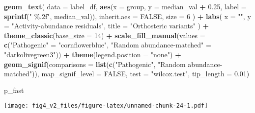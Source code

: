 \documentclass[
]{article}
\newenvironment{Shaded}{\begin{snugshade}}{\end{snugshade}}
\newcommand{\AttributeTok}[1]{\textcolor[rgb]{0.13,0.29,0.53}{#1}}
\newcommand{\ConstantTok}[1]{\textcolor[rgb]{0.56,0.35,0.01}{#1}}
\newcommand{\DecValTok}[1]{\textcolor[rgb]{0.00,0.00,0.81}{#1}}
\newcommand{\FloatTok}[1]{\textcolor[rgb]{0.00,0.00,0.81}{#1}}
\newcommand{\FunctionTok}[1]{\textcolor[rgb]{0.13,0.29,0.53}{\textbf{#1}}}
\newcommand{\NormalTok}[1]{#1}
\newcommand{\OtherTok}[1]{\textcolor[rgb]{0.56,0.35,0.01}{#1}}
\newcommand{\SpecialCharTok}[1]{\textcolor[rgb]{0.81,0.36,0.00}{\textbf{#1}}}
\newcommand{\StringTok}[1]{\textcolor[rgb]{0.31,0.60,0.02}{#1}}
\begin{document}
\begin{Shaded}
\begin{Highlighting}[]
  \FunctionTok{geom\_text}\NormalTok{(}
    \AttributeTok{data =}\NormalTok{ label\_df,}
    \FunctionTok{aes}\NormalTok{(}\AttributeTok{x =}\NormalTok{ group, }\AttributeTok{y =}\NormalTok{ median\_val }\SpecialCharTok{+} \FloatTok{0.25}\NormalTok{, }\AttributeTok{label =} \FunctionTok{sprintf}\NormalTok{(}\StringTok{" \%.2f"}\NormalTok{, median\_val)),}
    \AttributeTok{inherit.aes =} \ConstantTok{FALSE}\NormalTok{,}
    \AttributeTok{size =} \DecValTok{6}
\NormalTok{  ) }\SpecialCharTok{+}
  \FunctionTok{labs}\NormalTok{(}
    \AttributeTok{x =} \StringTok{""}\NormalTok{,}
    \AttributeTok{y =} \StringTok{"Activity{-}abundance residuals"}\NormalTok{,}
    \AttributeTok{title =} \StringTok{"Orthosteric variants"}
\NormalTok{  ) }\SpecialCharTok{+}
  \FunctionTok{theme\_classic}\NormalTok{(}\AttributeTok{base\_size =} \DecValTok{14}\NormalTok{) }\SpecialCharTok{+}
  \FunctionTok{scale\_fill\_manual}\NormalTok{(}\AttributeTok{values =} \FunctionTok{c}\NormalTok{(}\StringTok{"Pathogenic"} \OtherTok{=} \StringTok{"cornflowerblue"}\NormalTok{, }\StringTok{"Random abundance{-}matched"} \OtherTok{=} \StringTok{"darkolivegreen3"}\NormalTok{)) }\SpecialCharTok{+}
  \FunctionTok{theme}\NormalTok{(}\AttributeTok{legend.position =} \StringTok{"none"}\NormalTok{) }\SpecialCharTok{+}
  \FunctionTok{geom\_signif}\NormalTok{(}\AttributeTok{comparisons =} \FunctionTok{list}\NormalTok{(}\FunctionTok{c}\NormalTok{(}\StringTok{"Pathogenic"}\NormalTok{, }\StringTok{"Random abundance{-}matched"}\NormalTok{)),}
              \AttributeTok{map\_signif\_level =} \ConstantTok{FALSE}\NormalTok{,}
              \AttributeTok{test =} \StringTok{"wilcox.test"}\NormalTok{,}
              \AttributeTok{tip\_length =} \FloatTok{0.01}\NormalTok{)}


\NormalTok{p\_fast}
\end{Highlighting}
\end{Shaded}

\texttt{[image: fig4\_v2\_files/figure-latex/unnamed-chunk-24-1.pdf]}
\end{document}
